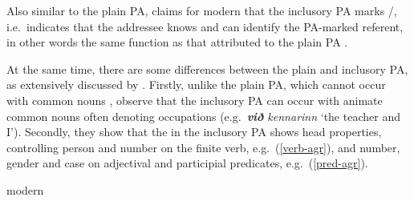 \documentclass[output=paper,colorlinks,citecolor=brown]{langscibook}
\begin{document}
Also similar to the plain PA, \citet{Sigurdsson2006} claims for modern  that the inclusory PA marks /, i.e.~indicates that the addressee knows and can identify the PA-marked referent, in other words the same function as that attributed to the plain PA \citep{Sigurdsson2006}.  

At the same time, there are some differences between the plain and inclusory PA, as extensively discussed by \citet{sigurdhsson2020we}. Firstly, unlike the plain PA, which cannot occur with common nouns \citep{Sigurdsson2006}, \citet{sigurdhsson2020we} observe that the inclusory PA can occur with animate common nouns often denoting occupations (e.g.~\textit{\textbf{við} kennarinn} `the teacher and I'). Secondly, they show that the  in the inclusory PA shows head properties, controlling person and number  on the finite verb, e.g.~(\ref{verb-agr}), and number, gender and case  on adjectival and participial predicates, e.g.~(\ref{pred-agr}).\largerpage

\ea \label{verb-agr} modern 
\z 
\z
\end{document}
